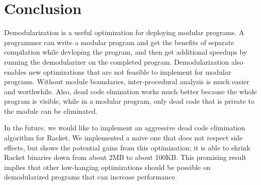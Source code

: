 \chapter{Conclusion}

Demodularization is a useful optimization for deploying modular programs. 
A programmer can write a modular program and get the benefits of separate compilation while devloping the program, and then get additional speedups by running the demodularizer on the completed program.
Demodularization also enables new optimizations that are not feasible to implement for modular programs.
Without module boundaries, inter-procedural analysis is much easier and worthwhile.
Also, dead code elmination works much better because the whole program is visible, while in a modular program, only dead code that is private to the module can be eliminated.

In the future, we would like to implement an aggressive dead code elimination algorithm for Racket.
We implemented a naive one that does not respect side effects, but shows the potential gains from this optimization; it is able to shrink Racket binaries down from about 2MB to about 100KB\@.
This promising result implies that other low-hanging optimizations should be possible on demodularized programs that can increase performance.

